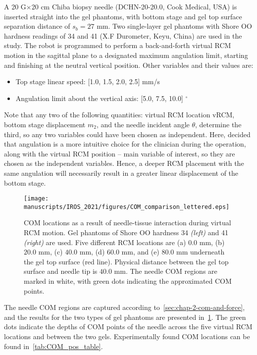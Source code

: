 A 20 G$\times$20 cm Chiba biopsy needle (DCHN-20-20.0, Cook Medical, USA) is inserted straight into the gel phantoms, with bottom stage and gel top surface separation distance of $s_b = 27$ mm. Two single-layer gel phantoms with Shore OO hardness readings of 34 and 41 (X.F Durometer, Keyu, China) are used in the study. The robot is programmed to perform a back-and-forth virtual RCM motion in the sagittal plane to a designated maximum angulation limit, starting and finishing at the neutral vertical position. Other variables and their values are:

\begin{itemize}
  \item Top stage linear speed: [1.0, 1.5, 2.0, 2.5] mm/s
  \item Angulation limit about the vertical axis: [5.0, 7.5, 10.0] $^\circ$
\end{itemize}


Note that any two of the following quantities: virtual RCM location vRCM, bottom stage displacement $m_2$, and the needle incident angle $\theta$, determine the third, so any two variables could have been chosen as independent. Here,  decided that angulation is a more intuitive choice for the clinician during the operation, along with the virtual RCM position --  main variable of interest, so they are chosen as the independent variables. Hence, a deeper RCM placement with the same angulation will necessarily result in a greater linear displacement of the bottom stage.

\begin{figure}[h]
  \centering
  \texttt{[image: manuscripts/IROS\_2021/figures/COM\_comparison\_lettered.eps]}
  \caption{COM locations as a result of needle-tissue interaction during virtual RCM motion. Gel phantoms of Shore OO hardness 34 \textit{(left)} and 41 \textit{(right)} are used. Five different RCM locations are (a) $0.0$ mm, (b) $20.0$ mm, (c) $40.0$ mm, (d) $60.0$ mm, and (e) $80.0$ mm underneath the gel top surface (red line). Physical distance between the gel top surface and needle tip is $40.0$ mm. The needle COM regions are marked in white, with green dots indicating the approximated COM points.}
  \label{fig:com_compare}
\end{figure}

The needle COM regions are captured according to~\cref{sec:chap-2-com-and-force}, and the results for the two types of gel phantoms are presented in~\cref{fig:com_compare}. The green dots indicate the depths of COM points of the needle across the five virtual RCM locations and between the two gels. Experimentally found COM locations can be found in~\cref{tab:COM_pos_table}.


